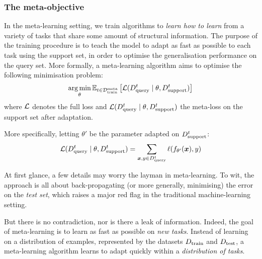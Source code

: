 \documentclass[11pt]{article}
\numberwithin{equation}{subsection}
\begin{document}
\subsubsection{The meta-objective}

In the meta-learning setting, we train algorithms to \textit{learn how to learn} from a variety of tasks that share some amount of structural information. The purpose of the training procedure is to teach the model to adapt as fast as possible to each task using the support set, in order to optimise the generalisation performance on the query set. More formally, a meta-learning algorithm aims to optimise the following minimisation problem:
\begin{equation}
  \label{eq:maml}
  \operatorname*{arg\,min}_\theta \mathbb{E}_{t \in {\mathcal{D}_\mathrm{train}^\mathrm{meta}}} \left[ \mathcal{L} ({D_{\mathrm{query}}^t} \mid \theta, {D_{\mathrm{support}}^t}) \right]
\end{equation}
where $\mathcal{L}$ denotes the full loss and $\mathcal{L} ({D_{\mathrm{query}}^t} \mid \theta, {D_{\mathrm{support}}^t})$ the meta-loss on the support set after adaptation.

More specifically, letting $\theta'$ be the parameter adapted on ${D_{\mathrm{support}}^t}$:
\begin{equation}
  \mathcal{L} ({D_{\mathrm{query}}^t} \mid \theta, {D_{\mathrm{support}}^t}) = \sum_{{\bm{x}}, y \in {D_{\mathrm{query}}^t}} \ell (f_{\theta'}({\bm{x}}), y)
\end{equation}


At first glance, a few details may worry the layman in meta-learning. To wit, the approach is all about back-propagating (or more generally, minimising) the error on the \textit{test set}, which raises a major red flag in the traditional machine-learning setting.

But there is no contradiction, nor is there a leak of information. Indeed, the goal of meta-learning is to learn as fast as possible on \textit{new tasks}.
Instead of learning on a distribution of examples, represented by the datasets ${D_{\mathrm{train}}}$ and ${D_{\mathrm{test}}}$, a meta-learning algorithm learns to adapt quickly within a \textit{distribution of tasks}.
\end{document}
